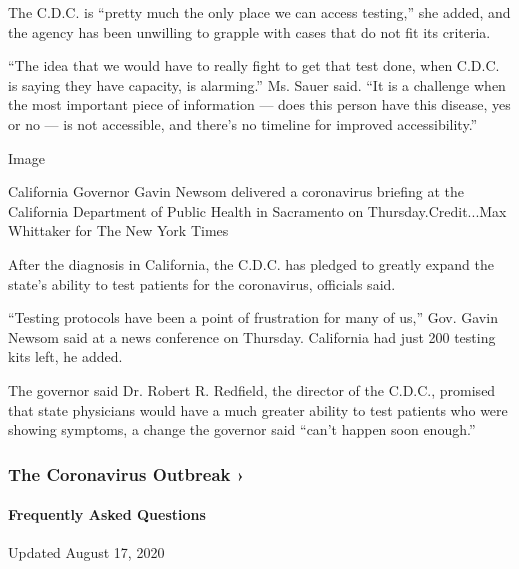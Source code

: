 The C.D.C. is ``pretty much the only place we can access testing,'' she
added, and the agency has been unwilling to grapple with cases that do
not fit its criteria.

``The idea that we would have to really fight to get that test done,
when C.D.C. is saying they have capacity, is alarming.'' Ms. Sauer said.
``It is a challenge when the most important piece of information ---
does this person have this disease, yes or no --- is not accessible, and
there's no timeline for improved accessibility.''

Image

California Governor Gavin Newsom delivered a coronavirus briefing at the
California Department of Public Health in Sacramento on
Thursday.Credit...Max Whittaker for The New York Times

After the diagnosis in California, the C.D.C. has pledged to greatly
expand the state's ability to test patients for the coronavirus,
officials said.

``Testing protocols have been a point of frustration for many of us,''
Gov. Gavin Newsom said at a news conference on Thursday. California had
just 200 testing kits left, he added.

The governor said Dr. Robert R. Redfield, the director of the C.D.C.,
promised that state physicians would have a much greater ability to test
patients who were showing symptoms, a change the governor said ``can't
happen soon enough.''

\href{https://www.nytimes3xbfgragh.onion/news-event/coronavirus?action=click\&pgtype=Article\&state=default\&region=MAIN_CONTENT_3\&context=storylines_faq}{}

\hypertarget{the-coronavirus-outbreak-}{%
\subsubsection{The Coronavirus Outbreak
›}\label{the-coronavirus-outbreak-}}

\hypertarget{frequently-asked-questions}{%
\paragraph{Frequently Asked
Questions}\label{frequently-asked-questions}}

Updated August 17, 2020

